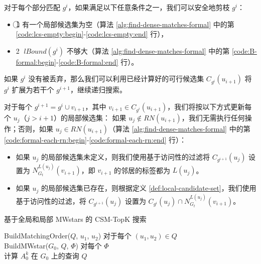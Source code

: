 对于每个部分匹配 $g^i$，如果满足以下任意条件之一，我们可以安全地剪枝 $g^i$：
\begin{itemize}
\item \textcircled{1} 有一个局部候选集为空（算法 \ref{alg:find-dense-matches-formal} 中的第 \ref{code:lcs-empty:begin}-\ref{code:lcs-empty:end} 行），
\item \textcircled{2} $lBound(g^i)$ 不够大（算法 \ref{alg:find-dense-matches-formal} 中的第 \ref{code:B-formal:begin}-\ref{code:B-formal:end} 行）。
\end{itemize}
如果 $g^i$ 没有被丢弃，那么我们可以利用已经计算好的可行候选集 $C_{g^i}(u_{i+1})$ 将 $g^i$ 扩展为若干个 $g^{i+1}$，继续递归搜索。

对于每个 $g^{i+1} = g^i \cup {v_{i+1}}$，其中 $v_{i+1} \in C_{g^i}(u_{i+1})$，我们将按以下方式更新每个 $u_j$（$j > i+1$）的局部候选集：
如果 $u_j \notin RN(u_{i+1})$，我们无需执行任何操作；否则，如果 $u_j \in RN(u_{i+1})$（算法 \ref{alg:find-dense-matches-formal} 中的第 \ref{code:formal-each-rn:begin}-\ref{code:formal-each-rn:end} 行）：
\begin{itemize}
\item 如果 $u_j$ 的局部候选集未定义，则我们使用基于访问性的过滤将 $C_{g^{i+1}}(u_j)$ 设置为 $N_{G_t}^{L(u_j)}(v_{i+1})$，即 $v_{i+1}$ 的邻居的标签都为 $L(u_j)$。
\item 如果 $u_j$ 的局部候选集已存在，则根据定义 \ref{def:local-candidate-set}，我们使用基于访问性的过滤，将 $C_{g^{i+1}}(u_j)$ 设置为 $C_{g^i}(u_j) \cap N_{G_t}^{L(u_j)}(v_{i+1})$。
\end{itemize}


\begin{algorithm}[h]
\small
\caption{基于全局和局部 MWstars 的 CSM-TopK 搜索}
\label{alg:localmwstar:framework}
BuildMatchingOrder($Q$, $u_1$, $u_2$) 对于每个 $(u_1, u_2) \in Q$ \\
BuildMWstar($G_0$, $Q$, $\Phi$) 对每个 $\Phi$  \\
计算 $A_0^k$ 在 $G_0$ 上的查询 $Q$ \\
\end{algorithm}

